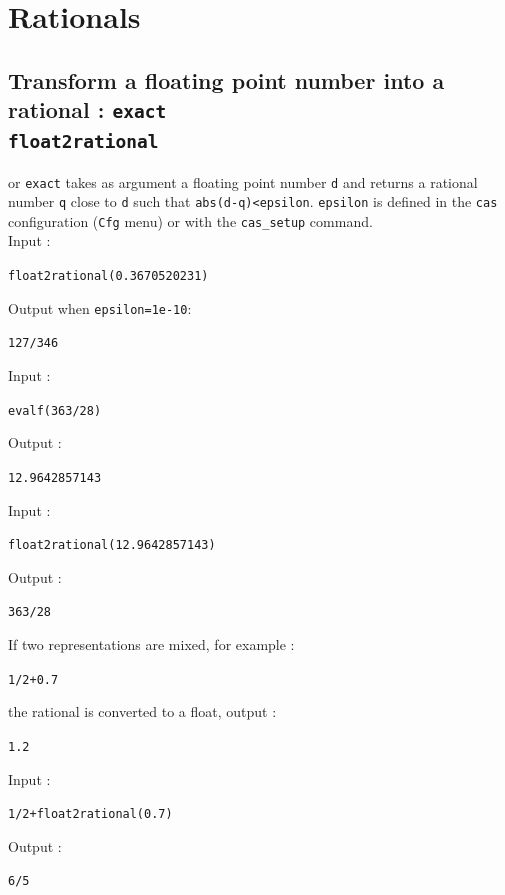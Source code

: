 \documentclass[a4paper,11pt]{book}
\begin{document}
\section{Rationals}
\subsection{Transform a floating point number into a rational : {\tt exact \\
float2rational}}
  or {\tt exact} takes as argument a  
floating point number {\tt d} and returns 
a rational number {\tt q} close to 
{\tt d} such that {\tt abs(d-q)<epsilon}. 
{\tt epsilon} is defined in the {\tt cas} configuration
({\tt Cfg} menu) or with the {\tt cas\_setup} command.\\
Input :
\begin{center}{\tt float2rational(0.3670520231)}\end{center}
Output when {\tt epsilon=1e-10}:
\begin{center}{\tt 127/346}\end{center}
Input :
\begin{center}{\tt evalf(363/28)}\end{center}
Output :
\begin{center}{\tt 12.9642857143}\end{center}
Input :
\begin{center}{\tt float2rational(12.9642857143)}\end{center}
Output :
\begin{center}{\tt 363/28}\end{center}
If two representations are mixed, for example :
\begin{center}{\tt 1/2+0.7}\end{center}
the rational is converted to a float, output :
\begin{center}{\tt 1.2}\end{center} 
Input :
\begin{center}{\tt 1/2+float2rational(0.7)}\end{center}
Output :
\begin{center}{\tt 6/5}\end{center}
\end{document}
